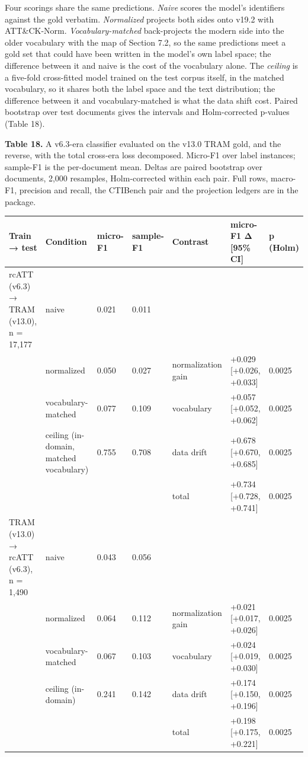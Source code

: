\documentclass[11pt,a4paper]{article}
\begin{document}
Four scorings share the same predictions. \emph{Naive} scores the model's identifiers against the gold verbatim. \emph{Normalized} projects both sides onto v19.2 with ATT\&CK-Norm. \emph{Vocabulary-matched} back-projects the modern side into the older vocabulary with the map of Section 7.2, so the same predictions meet a gold set that could have been written in the model's own label space; the difference between it and naive is the cost of the vocabulary alone. The \emph{ceiling} is a five-fold cross-fitted model trained on the test corpus itself, in the matched vocabulary, so it shares both the label space and the text distribution; the difference between it and vocabulary-matched is what the data shift cost. Paired bootstrap over test documents gives the intervals and Holm-corrected p-values (Table 18).

\textbf{Table 18.} A v6.3-era classifier evaluated on the v13.0 TRAM gold, and the reverse, with the total cross-era loss decomposed. Micro-F1 over label instances; sample-F1 is the per-document mean. Deltas are paired bootstrap over documents, 2,000 resamples, Holm-corrected within each pair. Full rows, macro-F1, precision and recall, the CTIBench pair and the projection ledgers are in the package.

\begin{center}\footnotesize
\begin{tabular}{lllllll}
\toprule
Train → test & Condition & micro-F1 & sample-F1 & Contrast & micro-F1 Δ [95\% CI] & p (Holm) \\
\midrule
rcATT (v6.3) → TRAM (v13.0), n = 17,177 & naive & 0.021 & 0.011 &  &  &  \\
 & normalized & 0.050 & 0.027 & normalization gain & +0.029 [+0.026, +0.033] & 0.0025 \\
 & vocabulary-matched & 0.077 & 0.109 & vocabulary & +0.057 [+0.052, +0.062] & 0.0025 \\
 & ceiling (in-domain, matched vocabulary) & 0.755 & 0.708 & data drift & +0.678 [+0.670, +0.685] & 0.0025 \\
 &  &  &  & total & +0.734 [+0.728, +0.741] & 0.0025 \\
TRAM (v13.0) → rcATT (v6.3), n = 1,490 & naive & 0.043 & 0.056 &  &  &  \\
 & normalized & 0.064 & 0.112 & normalization gain & +0.021 [+0.017, +0.026] & 0.0025 \\
 & vocabulary-matched & 0.067 & 0.103 & vocabulary & +0.024 [+0.019, +0.030] & 0.0025 \\
 & ceiling (in-domain) & 0.241 & 0.142 & data drift & +0.174 [+0.150, +0.196] & 0.0025 \\
 &  &  &  & total & +0.198 [+0.175, +0.221] & 0.0025 \\
\bottomrule
\end{tabular}
\end{center}
\end{document}
